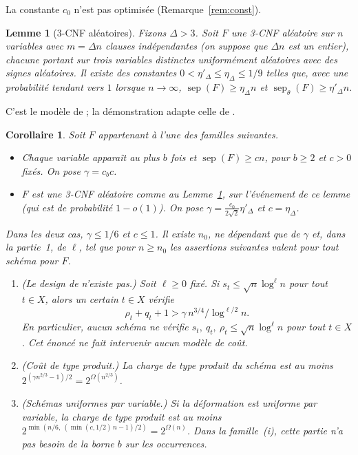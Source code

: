 \documentclass[11pt,a4paper]{article}
\newtheorem{lemma}[theorem]{Lemme}
\newtheorem{corollary}[theorem]{Corollaire}
\theoremstyle{definition}
\theoremstyle{remark}
\newcommand{\sep}{\operatorname{sep}}
\newcommand{\sepw}{\operatorname{sep}_{\theta}}
\begin{document}
La constante $c_0$ n'est pas optimisée (Remarque~\ref{rem:const}).

\begin{lemma}[3-CNF aléatoires]\label{lem:random}
Fixons $\Delta>3$. Soit $F$ une 3-CNF aléatoire sur $n$ variables avec $m=\Delta n$ clauses
indépendantes (on suppose que $\Delta n$ est un entier), chacune portant sur trois variables
distinctes uniformément aléatoires avec des signes aléatoires. Il existe des constantes
$0<\eta'_\Delta\le\eta_\Delta\le1/9$ telles que, avec une probabilité tendant vers $1$
lorsque $n\to\infty$, $\sep(F)\ge\eta_\Delta n$ et $\sepw(F)\ge\eta'_\Delta n$.
\end{lemma}

C'est le modèle de \cite[Annexe~A]{DL} ; la démonstration adapte celle de
\cite[Lemme~8.2]{DL}.

\begin{corollary}\label{cor:main}
Soit $F$ appartenant à l'une des familles suivantes.
\begin{itemize}
\item[\textup{(i)}] Chaque variable apparaît au plus $b$ fois et $\sep(F)\ge cn$, pour
 $b\ge2$ et $c>0$ fixés. On pose $\gamma=c_bc$.
\item[\textup{(ii)}] $F$ est une 3-CNF aléatoire comme au Lemme~\ref{lem:random}, sur
 l'événement de ce lemme (qui est de probabilité $1-o(1)$). On pose
 $\gamma=\frac{c_0}{2\sqrt2}\eta'_\Delta$ et $c=\eta_\Delta$.
\end{itemize}
Dans les deux cas, $\gamma\le1/6$ et $c\le1$. Il existe $n_0$, ne dépendant que de $\gamma$
et, dans la partie~1, de $\ell$, tel que pour $n\ge n_0$ les assertions suivantes valent pour
tout schéma pour $F$.
\begin{enumerate}
\item \textup{(Le design de \cite[Section~9]{DL} n'existe pas.)} Soit $\ell\ge0$ fixé.
 Si $s_t\le\sqrt n\log^{\ell}n$ pour tout $t\in X$, alors un certain $t\in X$ vérifie
 \[\rho_t+q_t+1>\gamma\,n^{3/4}/\log^{\ell/2}n .\]
 En particulier, aucun schéma ne vérifie $s_t,\ q_t,\ \rho_t\le\sqrt n\log^{\ell}n$ pour tout
 $t\in X$. Cet énoncé ne fait intervenir aucun modèle de coût.
\item \textup{(Coût de type produit.)} La charge de type produit du schéma est au moins
 $2^{(\gamma n^{2/3}-1)/2}=2^{\Omega(n^{2/3})}$.
\item \textup{(Schémas uniformes par variable.)} Si la déformation est uniforme par
 variable, la charge de type produit est au moins
 $2^{\min(n/6,\ (\min(c,1/2)\,n-1)/2)}=2^{\Omega(n)}$. Dans la
 famille~\textup{(i)}, cette partie n'a pas besoin de la borne $b$ sur les occurrences.
\end{enumerate}
\end{corollary}
\end{document}
